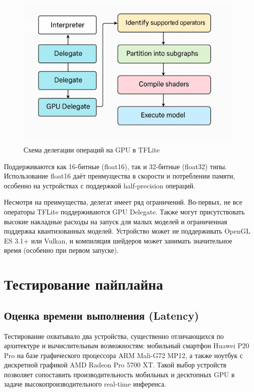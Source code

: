 \documentclass[a4paper,14pt]{extreport}
\begin{document}
            \begin{figure}[h]
                \centering
                \includegraphics[width=0.6\linewidth]{images-tflite/arch.png}
                \caption{Схема делегации операций на GPU в TFLite}
                \label{ris:tflite_gpu_delegate}
                \vspace*{20pt}
            \end{figure}
            
            Поддерживаются как 16-битные (float16), так и 32-битные (float32) типы. Использование float16 даёт преимущества в скорости и потреблении памяти, особенно на устройствах с поддержкой half-precision операций.
        
            Несмотря на преимущества, делегат имеет ряд ограничений. Во-первых, не все операторы TFLite поддерживаются GPU Delegate. Также могут присутствовать высокие накладные расходы на запуск для малых моделей и ограниченная поддержка квантизованных моделей. Устройство может не поддерживать OpenGL ES 3.1+ или Vulkan, и компиляция шейдеров может занимать значительное время (особенно при первом запуске).

        \section{Тестирование пайплайна}
            \subsection{Оценка времени выполнения (Latency)}
            Тестирование охватывало два устройства, существенно отличающихся по архитектуре и вычислительным возможностям: мобильный смартфон Huawei P20 Pro на базе графического процессора ARM Mali-G72 MP12, а также ноутбук с дискретной графикой AMD Radeon Pro 5700 XT. Такой выбор устройств позволяет сопоставить производительность мобильных и десктопных GPU в задаче высокопроизводительного real-time инференса.
            
\end{document}
